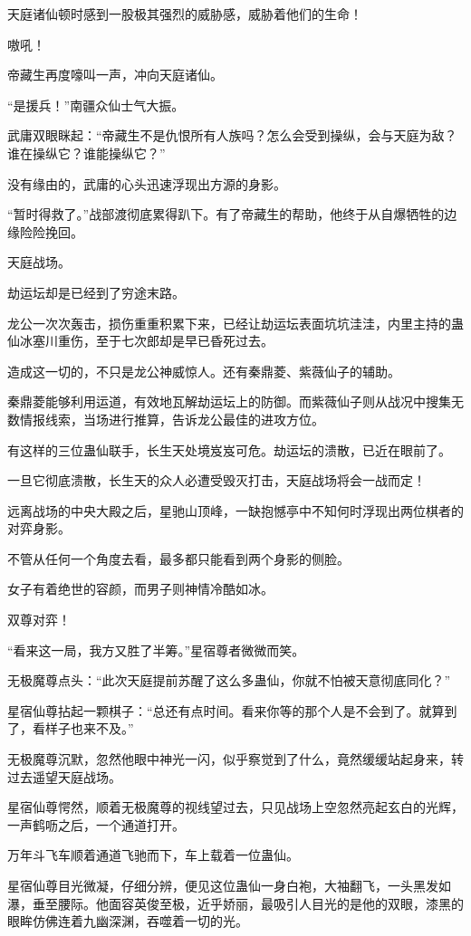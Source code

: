 \begin{this_body}
天庭诸仙顿时感到一股极其强烈的威胁感，威胁着他们的生命！

嗷吼！

帝藏生再度嚎叫一声，冲向天庭诸仙。

“是援兵！”南疆众仙士气大振。

武庸双眼眯起：“帝藏生不是仇恨所有人族吗？怎么会受到操纵，会与天庭为敌？谁在操纵它？谁能操纵它？”

没有缘由的，武庸的心头迅速浮现出方源的身影。

“暂时得救了。”战部渡彻底累得趴下。有了帝藏生的帮助，他终于从自爆牺牲的边缘险险挽回。

天庭战场。

劫运坛却是已经到了穷途末路。

龙公一次次轰击，损伤重重积累下来，已经让劫运坛表面坑坑洼洼，内里主持的蛊仙冰塞川重伤，至于七次郎却是早已昏死过去。

造成这一切的，不只是龙公神威惊人。还有秦鼎菱、紫薇仙子的辅助。

秦鼎菱能够利用运道，有效地瓦解劫运坛上的防御。而紫薇仙子则从战况中搜集无数情报线索，当场进行推算，告诉龙公最佳的进攻方位。

有这样的三位蛊仙联手，长生天处境岌岌可危。劫运坛的溃散，已近在眼前了。

一旦它彻底溃散，长生天的众人必遭受毁灭打击，天庭战场将会一战而定！

远离战场的中央大殿之后，星驰山顶峰，一缺抱憾亭中不知何时浮现出两位棋者的对弈身影。

不管从任何一个角度去看，最多都只能看到两个身影的侧脸。

女子有着绝世的容颜，而男子则神情冷酷如冰。

双尊对弈！

“看来这一局，我方又胜了半筹。”星宿尊者微微而笑。

无极魔尊点头：“此次天庭提前苏醒了这么多蛊仙，你就不怕被天意彻底同化？”

星宿仙尊拈起一颗棋子：“总还有点时间。看来你等的那个人是不会到了。就算到了，看样子也来不及。”

无极魔尊沉默，忽然他眼中神光一闪，似乎察觉到了什么，竟然缓缓站起身来，转过去遥望天庭战场。

星宿仙尊愕然，顺着无极魔尊的视线望过去，只见战场上空忽然亮起玄白的光辉，一声鹤呖之后，一个通道打开。

万年斗飞车顺着通道飞驰而下，车上载着一位蛊仙。

星宿仙尊目光微凝，仔细分辨，便见这位蛊仙一身白袍，大袖翻飞，一头黑发如瀑，垂至腰际。他面容英俊至极，近乎娇丽，最吸引人目光的是他的双眼，漆黑的眼眸仿佛连着九幽深渊，吞噬着一切的光。


\end{this_body}
